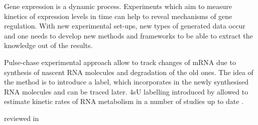 Gene expression is a dynamic process. Experiments which aim to measure
kinetics of expression levels in time can help to reveal mechanisms of gene regulation. 
With  new experimental set-ups, new types of generated data occur and one needs
to develop new methods and frameworks to be able to extract the knowledge out of 
the results.
\par 
Pulse-chase experimental approach allow to track changes 
of mRNA due to synthesis of nascent RNA molecules and
degradation of the old ones. The idea of the method is to introduce a label, which 
incorporates in the newly synthesised RNA molecules and can be traced later.
4sU labelling introduced by \citep{dolken2008high} allowed to estimate 
kinetic rates of RNA metabolism in a number of studies up to date 
\citep{
sabo2014selective,
rabani2011metabolic,
miller2011dynamic,
schwanhausser2011global,
eser2016determinants,
schwalb2016tt,
marzi2016degradation,
zhang2016biogenesis,
neymotin2014determination,
mukherjee2016integrative}.

reviewed in \citep{wachutka2016measures}